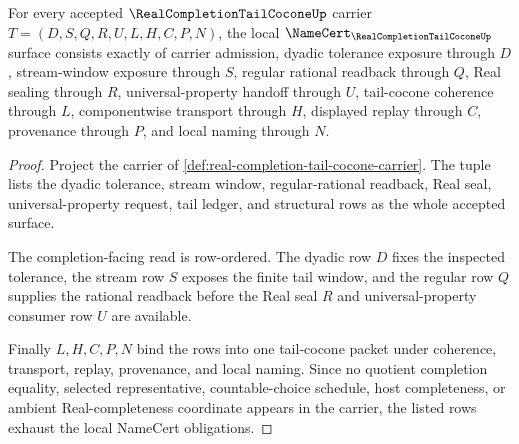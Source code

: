 \begin{theorem}
\label{thm:real-completion-tail-cocone-namecert-obligations}
For every accepted $\RealCompletionTailCoconeUp$ carrier $T=(D,S,Q,R,U,L,H,C,P,N)$, the local $\NameCert_{\RealCompletionTailCoconeUp}$ surface consists exactly of carrier admission, dyadic tolerance exposure through $D$, stream-window exposure through $S$, regular rational readback through $Q$, Real sealing through $R$, universal-property handoff through $U$, tail-cocone coherence through $L$, componentwise transport through $H$, displayed replay through $C$, provenance through $P$, and local naming through $N$.
\end{theorem}
\begin{proof}
Project the carrier of \autoref{def:real-completion-tail-cocone-carrier}. The tuple lists the dyadic tolerance, stream window, regular-rational readback, Real seal, universal-property request, tail ledger, and structural rows as the whole accepted surface.

The completion-facing read is row-ordered. The dyadic row $D$ fixes the inspected tolerance, the stream row $S$ exposes the finite tail window, and the regular row $Q$ supplies the rational readback before the Real seal $R$ and universal-property consumer row $U$ are available.

Finally $L,H,C,P,N$ bind the rows into one tail-cocone packet under coherence, transport, replay, provenance, and local naming. Since no quotient completion equality, selected representative, countable-choice schedule, host completeness, or ambient Real-completeness coordinate appears in the carrier, the listed rows exhaust the local NameCert obligations.
\end{proof}

